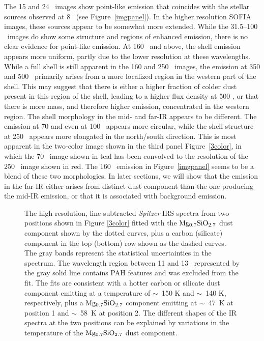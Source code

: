 \documentclass{emulateapj}
\newcommand{\spitzer}{\textit{Spitzer }}
\begin{document}
The 15 and 24 \micron\ images show point-like emission that coincides with the stellar sources observed at 8 \micron\ (see Figure~\ref{imgpanel}). In the higher resolution SOFIA images, these sources appear to be somewhat more extended. While the 31.5--100 \micron\ images do show some structure and regions of enhanced emission, there is no clear evidence for point-like emission. At 160 \micron\ and above, the shell emission appears more uniform, partly due to the lower resolution at these wavelengths. While a full shell is still apparent in the 160 and 250 \micron\ images, the emission at 350 and 500 \micron\ primarily arises from a more localized region in the western part of the shell. This may suggest that there is either a higher fraction of colder dust present in this region of the shell, leading to a higher flux density at 500 \micron, or that there is more mass, and therefore higher emission, concentrated in the western region. The shell morphology in the mid- and far-IR appears to be different. The emission at 70 and even at 100 \micron\ appears more circular, while the shell structure at 250 \micron\ appears more elongated in the north/south direction. This is most apparent in the two-color image shown in the third panel Figure~\ref{3color}, in which the 70 \micron\ image shown in teal has been convolved to the resolution of the 250 \micron\ image shown in red. The 160 \micron\ emission in Figure~\ref{imgpanel} seems to be a blend of these two morphologies. In later sections, we will show that the emission in the far-IR either arises from distinct dust component than the one producing the mid-IR emission, or that it is associated with background emission.


\begin{figure*}
\center
{} 
 
 
 
\caption{\label{irsspec}The high-resolution, line-subtracted \spitzer IRS spectra from two positions shown in Figure \ref{3color} fitted with the $\rm Mg_{0.7}SiO_{2.7}$ dust component shown by the dotted curves, plus a carbon (silicate) component in the top (bottom) row shown as the dashed curves. The gray bands represent the statistical uncertainties in the spectrum. The wavelength region between 11 and 13 \micron\ represented by the gray solid line contains PAH features and was excluded from the fit. The fits are consistent with a hotter carbon or silicate dust component emitting at a temperature of $\sim$~150 K and $\sim$~140 K, respectively, plus a $\rm Mg_{0.7}SiO_{2.7}$ component emitting at $\sim$~47~K at position 1 and  $\sim$~58~K at position 2. The different shapes of the IR spectra at the two positions can be explained by variations in the temperature of the $\rm Mg_{0.7}SiO_{2.7}$ dust component.}
\end{figure*}
\end{document}

